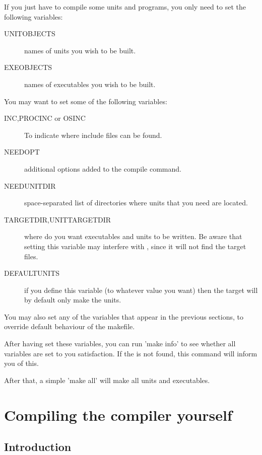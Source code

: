 \documentclass{report}
\begin{document}
If you just have to compile some units and programs, you only need to set
the following variables:
\begin{description}
\item[UNITOBJECTS] names of units you wish to be built.
\item[EXEOBJECTS] names of executables you wish to be built.
\end{description}

You may want to set some of the following variables:
\begin{description}
\item[INC,PROCINC or OSINC] To indicate where include files can be found.
\item[NEEDOPT] additional options added to the compile command.
\item[NEEDUNITDIR] space-separated list of directories where units that you
need are located.
\item[TARGETDIR,UNITTARGETDIR] where do you want executables and units to 
be written. Be aware that setting this variable may interfere with 
, since it will not find the target files.
\item[DEFAULTUNITS] if you define this variable (to whatever value you want)
then the  target will by default only make the units.
\end{description}

You may also set any of the variables that appear in the previous sections, 
to override default behaviour of the makefile.

After having set these variables, you can run 'make info' to see whether all
variables are set to you satisfaction. If the  is not
found, this command will inform you of this.

After that, a simple 'make all' will make all units and executables.


\chapter{Compiling the compiler yourself}
\label{ch:AppF}

\section{Introduction}
\end{document}
